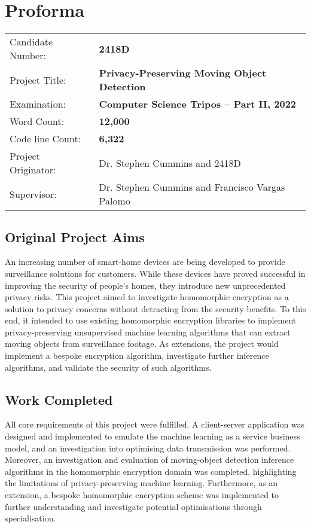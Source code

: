 \pagestyle{plain}

\chapter*{Proforma}

{\large
\begin{tabular}{ll}
Candidate Number:   & \bf 2418D                                      \\
Project Title:      & \bf Privacy-Preserving Moving Object Detection \\
Examination:        & \bf Computer Science Tripos -- Part II, 2022   \\
Word Count:         & \bf 12,000\footnotemark[1]                        \\
Code line Count:    & \bf 6,322                                       \\
Project Originator: & Dr. Stephen Cummins and 2418D                      \\
Supervisor:         & Dr. Stephen Cummins and Francisco Vargas Palomo    \\ 
\end{tabular}
}

\section*{Original Project Aims}
\indent \indent
An increasing number of smart-home devices are being developed to provide surveillance solutions for customers. While these devices have proved successful in improving the security of people's homes, they introduce new unprecedented privacy risks. This project aimed to investigate homomorphic encryption as a solution to privacy concerns without detracting from the security benefits. To this end, it intended to use existing homomorphic encryption libraries to implement privacy-preserving unsupervised machine learning algorithms that can extract moving objects from surveillance footage. As extensions, the project would implement a bespoke encryption algorithm, investigate further inference algorithms, and validate the security of such algorithms.





\section*{Work Completed}
\indent \indent
All core requirements of this project were fulfilled. A client-server application was designed and implemented to emulate the machine learning as a service business model, and an investigation into optimising data transmission was performed. Moreover, an investigation and evaluation of moving-object detection inference algorithms in the homomorphic encryption domain was completed, highlighting the limitations of privacy-preserving machine learning. Furthermore, as an extension, a bespoke homomorphic encryption scheme was implemented to further understanding and investigate potential optimisations through specialisation.


